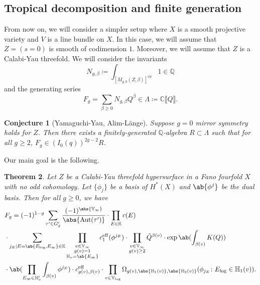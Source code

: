 \documentclass{amsart}
\newtheorem{thm}{Theorem}[section]
\newtheorem{conj}[thm]{Conjecture}
\theoremstyle{definition}
\theoremstyle{remark}
\theoremstyle{plain}
\theoremstyle{definition}
\theoremstyle{remark}
\newcommand{\C}{\mathbb{C}}
\newcommand{\Q}{\mathbb{Q}}
\newcommand{\E}{\mathbb{E}}
\newcommand{\V}{\mathbb{V}}
\renewcommand{\H}{\mathbb{H}}
\newcommand{\mr}[1]{\mathrm{#1}}
\newcommand{\on}[1]{\operatorname{#1}}
\newcommand{\1}{\mathbf{1}}
\newcommand{\2}{\mathbf{2}}
\newcommand{\3}{\mathbf{3}}
\newcommand{\vir}{\mr{vir}}
\newcommand{\ps}[1]{\llbracket #1 \rrbracket}
\DeclareMathOperator{\Aut}{Aut}
\begin{document}
\subsection{Tropical decomposition and finite generation}%
\label{sub:Tropical decomposition and finite generation}

From now on, we will consider a simpler setup where \(X\) is a smooth projective variety and \(V\) is a line bundle on \(X\). In this case, we will assume that \(Z = (s = 0)\) is smooth of codimension \(1\). Moreover, we will assume that \(Z\) is a Calabi-Yau threefold. We will consider the invariants
\[ N_{g, \beta} \coloneqq \int_{[\bar{M}_{g,0}(Z, \beta)]^{\vir}} 1 \in \Q \]
and the generating series
\[ F_g = \sum_{\beta \geq 0} N_{g, \beta} Q^{\beta} \in \Lambda \coloneqq \C \ps{Q}. \]

\begin{conj}[Yamaguchi-Yau, Alim-L\"ange]
    Suppose \(g=0\) mirror symmetry holds for \(Z\). Then there exists a finitely-generated \(\Q\)-algebra \(R \subset \Lambda\) such that for all \(g \geq 2\), \(F_g \in (I_0(q))^{2g-2} R\).
\end{conj}

Our main goal is the following.

\begin{thm}
    Let \(Z\) be a Calabi-Yau threefold hypersurface in a Fano fourfold \(X\) with no odd cohomology. Let \(\{\phi_j\}\) be a basis of \(H^*(X)\) and \(\ab\{\phi^j\}\) be the dual basis. Then for all \(g \geq 0\), we have
    \begin{align*}
        &F_g = (-1)^{1-g} \sum_{\tau' \in G_g'} \frac{(-1)^{\abs{\V_{\infty}}}}{\abs{\Aut(\tau')}} \cdot \prod_{E \in \E} c(E) \\
        & \cdot \sum_{j_E \mid E = \ab\{E_{\log}, E_{\infty}\} \in \E} \prod_{\substack{v \in \V_{\infty} \\ g(v)=1 \\ \H_v = \ab\{E_{\infty}\}}} c_1^{\mr{eff}}(\phi^{j_E}) \cdot \prod_{\substack{v \in \V_{\infty} \\ g(v) \geq 2}} \tilde{Q}^{\beta(v)} \cdot \exp \ab(\int_{\beta(v)} K(Q) )  \\
        & \cdot \ab(\prod_{E_{\infty} \in \H_v'}\int_{\beta(v)} \phi^{j_E}) \cdot c_{g(v), \beta(v)}^{\on{eff}} 
         \cdot \prod_{v \in \V_{\log}} \Omega_{g(v), \abs{\H_1(v)}, \abs{\H_2(v)}} (\phi_{j_E} \colon E_{\log} \in \H_1(v)).
    \end{align*}
\end{thm}
\end{document}
